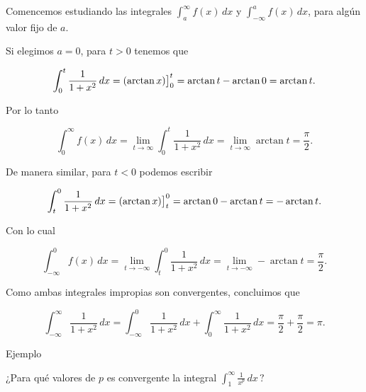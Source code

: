\documentclass[
  letterpaper,
]{book}
\theoremstyle{plain}
\theoremstyle{remark}
\begin{document}
\begin{tcolorbox}[enhanced jigsaw, opacityback=0, left=2mm, opacitybacktitle=0.6, toprule=.15mm, bottomrule=.15mm, colbacktitle=quarto-callout-tip-color!10!white, titlerule=0mm, bottomtitle=1mm, title=\textcolor{quarto-callout-tip-color}{\faLightbulb}\hspace{0.5em}{Solución}, toptitle=1mm, colframe=quarto-callout-tip-color-frame, colback=white, breakable, rightrule=.15mm, arc=.35mm, leftrule=.75mm, coltitle=black]

Comencemos estudiando las integrales
\(\displaystyle\int_a^\infty f(x)\,dx\) y
\(\displaystyle\int_{-\infty}^a f(x)\,dx\), para algún valor fijo de
\(a\).

Si elegimos \(a=0\), para \(t>0\) tenemos que

\[
\int_0^t \frac{1}{1+x^2}\,dx=(\arctan x)\big{]}_0^t=\arctan t-\arctan 0 =\arctan t.
\]

Por lo tanto

\[
\int_0^\infty f(x)\, dx=\lim_{t\to \infty} \int_0^t \frac{1}{1+x^2}\,dx =\lim_{t\to \infty} \arctan t =\frac{\pi}{2}.
\]

De manera similar, para \(t<0\) podemos escribir

\[
\int_t^0 \frac{1}{1+x^2}\,dx=(\arctan x)\big{]}_t^0=\arctan 0-\arctan t =-\arctan t.
\]

Con lo cual

\[
\int_{-\infty}^0 f(x)\, dx=\lim_{t\to -\infty} \int_t^0 \frac{1}{1+x^2}\,dx =\lim_{t\to -\infty} -\arctan t =\frac{\pi}{2}.
\]

Como ambas integrales impropias son convergentes, concluimos que

\[
\int_{-\infty}^\infty \frac{1}{1+x^2}\,dx=\int_{-\infty}^0 \frac{1}{1+x^2}\,dx+\int_{0}^\infty \frac{1}{1+x^2}\,dx=\frac{\pi}{2}+\frac{\pi}{2}=\pi.
\]

\end{tcolorbox}

Ejemplo

¿Para qué valores de \(p\) es convergente la integral
\(\displaystyle \int_{1}^{\infty} \frac{1}{x^{p}}\,dx \, ?\)
\end{document}
